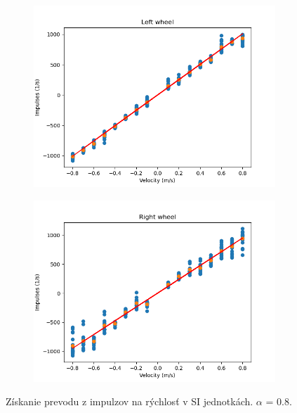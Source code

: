 \begin{figure}[!htbp]
	\begin{subfigure}{0.5\textwidth}
		\includegraphics[width=\textwidth]{img/lw_08250.png}
	\end{subfigure}
	\hfill
	\begin{subfigure}{0.5\textwidth}
		\includegraphics[width=\textwidth]{img/rw_08250.png}
	\end{subfigure}
	\caption{Získanie prevodu z impulzov na rýchlosť v SI jednotkách. \(\alpha\) = 0.8.}
	\label{fig:rw_lw_07250}
\end{figure}

